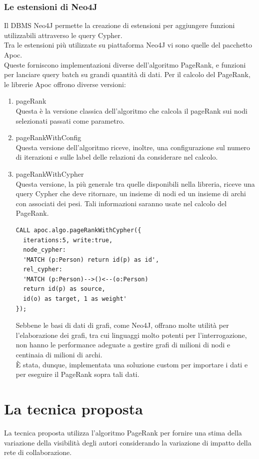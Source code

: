 \documentclass[a4paper, 12pt]{article}
\let\oldsection\section
\renewcommand\section{\clearpage\oldsection}
\begin{document}
\subsubsection{Le estensioni di Neo4J}
Il DBMS Neo4J permette la creazione di estensioni per aggiungere funzioni utilizzabili attraverso le query Cypher. \\
Tra le estensioni più utilizzate su piattaforma Neo4J vi sono quelle del pacchetto Apoc. \\
Queste forniscono implementazioni diverse dell'algoritmo PageRank, e funzioni per lanciare query batch su grandi quantità di dati.
Per il calcolo del PageRank, le librerie Apoc offrono diverse versioni:
\begin{enumerate}
  \item pageRank \\
  Questa è la versione classica dell'algoritmo che calcola il pageRank sui nodi selezionati passati come parametro.
  \item pageRankWithConfig \\
  Questa versione dell'algoritmo riceve, inoltre, una configurazione sul numero di iterazioni e sulle label delle relazioni da considerare nel calcolo.
  \item pageRankWithCypher \\
  Questa versione, la più generale tra quelle disponibili nella libreria, riceve una query Cypher che deve ritornare, un insieme di nodi ed un insieme di archi con associati dei pesi. Tali informazioni saranno usate nel calcolo del PageRank.
  \begin{lstlisting}
CALL apoc.algo.pageRankWithCypher({
  iterations:5, write:true, 
  node_cypher:
  'MATCH (p:Person) return id(p) as id',
  rel_cypher: 
  'MATCH (p:Person)-->()<--(o:Person)
  return id(p) as source,
  id(o) as target, 1 as weight'
});
\end{lstlisting} 

\par
Sebbene le basi di dati di grafi, come Neo4J, offrano molte utilità per l'elaborazione dei grafi, tra cui linguaggi molto potenti per l'interrogazione, non hanno le performance adeguate a gestire grafi di milioni di nodi e centinaia di milioni di archi. \\
\`E stata, dunque, implementata una soluzione custom per importare i dati e per eseguire il PageRank sopra tali dati.
\end{enumerate}

\section{La tecnica proposta}
La tecnica proposta utilizza l'algoritmo PageRank per fornire una stima della variazione della visibilità degli autori considerando la variazione di impatto della rete di collaborazione. 
\end{document}
